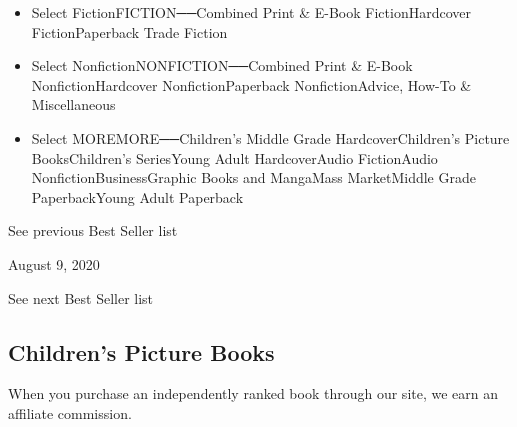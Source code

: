 \begin{itemize}
\tightlist
\item
  Select FictionFICTION──Combined Print \& E-Book FictionHardcover
  FictionPaperback Trade Fiction
\item
  Select NonfictionNONFICTION──Combined Print \& E-Book
  NonfictionHardcover NonfictionPaperback NonfictionAdvice, How-To \&
  Miscellaneous
\item
  Select MOREMORE──Children's Middle Grade HardcoverChildren's Picture
  BooksChildren's SeriesYoung Adult HardcoverAudio FictionAudio
  NonfictionBusinessGraphic Books and MangaMass MarketMiddle Grade
  PaperbackYoung Adult Paperback
\end{itemize}

\href{/books/best-sellers/2020/08/02/picture-books/}{}

See previous Best Seller list

August 9, 2020

See next Best Seller list

\hypertarget{childrens-picture-books}{%
\subsection{Children's Picture Books}\label{childrens-picture-books}}

When you purchase an independently ranked book through our site, we earn
an affiliate commission.

